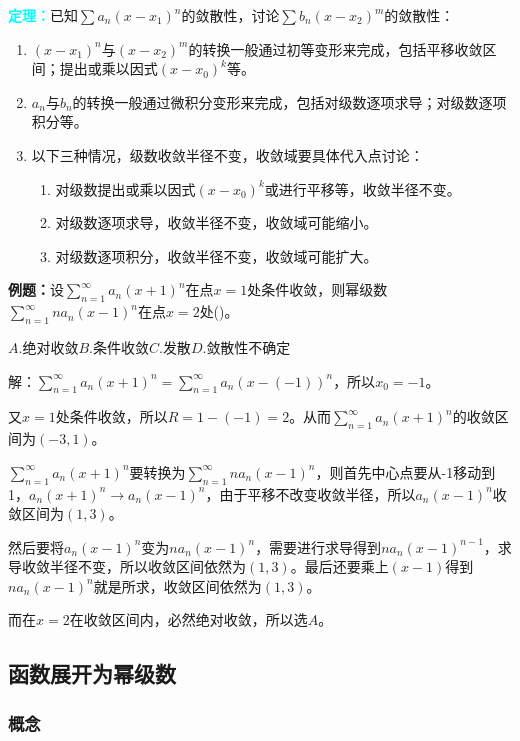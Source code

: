 \documentclass[UTF8, 12pt]{ctexart}
\begin{document}
\textcolor{aqua}{\textbf{定理：}}已知$\sum a_n(x-x_1)^n$的敛散性，讨论$\sum b_n(x-x_2)^m$的敛散性：

\begin{enumerate}
    \item $(x-x_1)^n$与$(x-x_2)^m$的转换一般通过初等变形来完成，包括平移收敛区间；提出或乘以因式$(x-x_0)^k$等。
    \item $a_n$与$b_n$的转换一般通过微积分变形来完成，包括对级数逐项求导；对级数逐项积分等。
    \item 以下三种情况，级数收敛半径不变，收敛域要具体代入点讨论：\begin{enumerate}
        \item 对级数提出或乘以因式$(x-x_0)^k$或进行平移等，收敛半径不变。
        \item 对级数逐项求导，收敛半径不变，收敛域可能缩小。
        \item 对级数逐项积分，收敛半径不变，收敛域可能扩大。
    \end{enumerate}
\end{enumerate}

\textbf{例题：}设$\sum\limits_{n=1}^\infty a_n(x+1)^n$在点$x=1$处条件收敛，则幂级数$\sum\limits_{n=1}^\infty na_n(x-1)^n$在点$x=2$处()。

$A.$绝对收敛\qquad$B.$条件收敛\qquad$C.$发散\qquad$D.$敛散性不确定

解：$\sum\limits_{n=1}^\infty a_n(x+1)^n=\sum\limits_{n=1}^\infty a_n(x-(-1))^n$，所以$x_0=-1$。

又$x=1$处条件收敛，所以$R=1-(-1)=2$。从而$\sum\limits_{n=1}^\infty a_n(x+1)^n$的收敛区间为$(-3,1)$。

$\sum\limits_{n=1}^\infty a_n(x+1)^n$要转换为$\sum\limits_{n=1}^\infty na_n(x-1)^n$，则首先中心点要从-1移动到1，$a_n(x+1)^n\to a_n(x-1)^n$，由于平移不改变收敛半径，所以$a_n(x-1)^n$收敛区间为$(1,3)$。

然后要将$a_n(x-1)^n$变为$na_n(x-1)^n$，需要进行求导得到$na_n(x-1)^{n-1}$，求导收敛半径不变，所以收敛区间依然为$(1,3)$。最后还要乘上$(x-1)$得到$na_n(x-1)^n$就是所求，收敛区间依然为$(1,3)$。

而在$x=2$在收敛区间内，必然绝对收敛，所以选$A$。

\subsection{函数展开为幂级数}

\subsubsection{概念}
\end{document}
